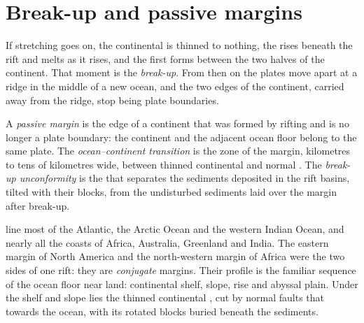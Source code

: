 \section{Break-up and passive margins}

If stretching goes on, the continental  is thinned to nothing, the 
rises beneath the rift and melts as it rises, and the first 
forms between the two halves of the continent. That moment is the
\emph{break-up}. From then on the plates move apart at a ridge in the middle of
a new ocean, and the two edges of the continent, carried away from the ridge,
stop being plate boundaries.

\begin{definition}\label{def:b1:rifts-ridges-margins:passive-margin}
A \emph{passive margin} is the edge of a continent that
was formed by rifting and is no longer a plate boundary: the continent and the
adjacent ocean floor belong to the same plate. The
\emph{ocean--continent transition} is the
zone of the margin, kilometres to tens of kilometres wide, between thinned
continental  and normal . The \emph{break-up
unconformity} is the  that separates
the sediments deposited in the rift basins, tilted with their blocks, from the
undisturbed sediments laid over the margin after break-up.
\end{definition}

 line most of the Atlantic, the Arctic Ocean and the western Indian
Ocean, and nearly all the coasts of Africa, Australia, Greenland and India. The
eastern margin of North America and the north-western margin of Africa were
the two sides of one rift: they are \emph{conjugate} margins. Their profile is
the familiar sequence of the ocean floor near land: continental shelf, slope,
rise and abyssal plain. Under the shelf and slope lies the thinned continental
, cut by normal faults that  towards the ocean, with its rotated
blocks buried beneath the sediments.

